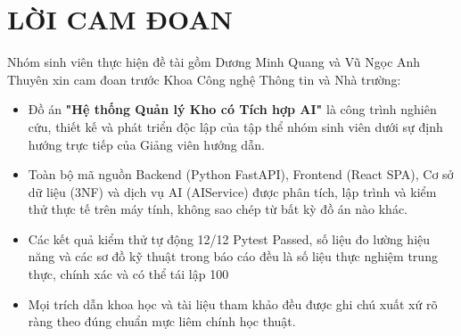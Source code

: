 \chapter*{LỜI CAM ĐOAN}

Nhóm sinh viên thực hiện đề tài gồm Dương Minh Quang và Vũ Ngọc Anh Thuyên xin cam đoan trước Khoa Công nghệ Thông tin và Nhà trường:
\begin{itemize}
  \item Đồ án \textbf{"Hệ thống Quản lý Kho có Tích hợp AI"} là công trình nghiên cứu, thiết kế và phát triển độc lập của tập thể nhóm sinh viên dưới sự định hướng trực tiếp của Giảng viên hướng dẫn.
  \item Toàn bộ mã nguồn Backend (Python FastAPI), Frontend (React SPA), Cơ sở dữ liệu (3NF) và dịch vụ AI (AIService) được phân tích, lập trình và kiểm thử thực tế trên máy tính, không sao chép từ bất kỳ đồ án nào khác.
  \item Các kết quả kiểm thử tự động 12/12 Pytest Passed, số liệu đo lường hiệu năng và các sơ đồ kỹ thuật trong báo cáo đều là số liệu thực nghiệm trung thực, chính xác và có thể tái lập 100%
  \item Mọi trích dẫn khoa học và tài liệu tham khảo đều được ghi chú xuất xứ rõ ràng theo đúng chuẩn mực liêm chính học thuật.
\end{itemize}
